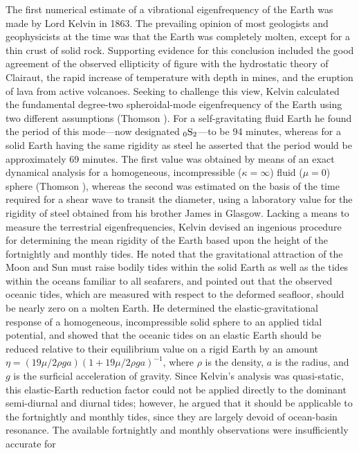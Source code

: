 The first numerical estimate of a vibrational eigenfrequency of the
Earth was made by Lord Kelvin in 1863.  The prevailing opinion of most
geologists and geophysicists at the time was that the Earth was completely
molten, except for a thin crust of solid rock.  Supporting evidence for
this conclusion included the good agreement of the observed ellipticity
of figure with the hydrostatic theory of Clairaut, the rapid increase of
temperature with depth in mines, and the eruption of lava from active volcanoes.
Seeking to challenge this view, Kelvin calculated the fundamental degree-two
spheroidal-mode eigenfrequency of the Earth using two different assumptions
(Thomson \citeyear{kelvin63a}).  For a self-gravitating fluid Earth he found
the period of this mode---now designated ${}_0{\rm S}_2$---to be 94 minutes,
whereas for a solid Earth having the same rigidity as steel he asserted that
the period would be approximately 69 minutes.
The first value was obtained by means of an exact dynamical
analysis for a homogeneous, incompressible ($\kappa=\infty$)
fluid ($\mu=0$) sphere (Thomson \citeyear{kelvin63b}),
whereas the second was estimated on the basis
of the time required for a shear wave to transit the diameter,
using a laboratory value for the rigidity of steel obtained from
his brother James in Glasgow.
Lacking a means to measure the terrestrial eigenfrequencies, Kelvin
devised an ingenious procedure for determining the mean rigidity of the Earth
based upon the height of the fortnightly and monthly tides.
He noted that the gravitational attraction of the Moon and Sun
must raise bodily tides within the solid Earth as well as the tides
within the oceans familiar to all seafarers, and pointed out that the
observed oceanic tides, which are measured with respect to the deformed
seafloor, should be nearly zero on a molten Earth.
He determined the elastic-gravitational response of a homogeneous,
incompressible solid sphere to an applied tidal potential,
and showed that the oceanic tides on an elastic Earth should be reduced
relative to their equilibrium value on a rigid Earth by an amount
$\eta=(19\mu/2\rho ga)(1+19\mu/2\rho ga)^{-1}$,
where $\rho$ is the density, $a$ is the radius, and $g$
is the surficial acceleration of gravity.  Since Kelvin's
analysis was quasi-static, this elastic-Earth reduction factor
could not be applied directly to the dominant semi-diurnal and
diurnal tides; however, he argued that it should be applicable
to the fortnightly and monthly tides, since they are largely
devoid of ocean-basin resonance.  The available fortnightly
and monthly observations were insufficiently accurate for
